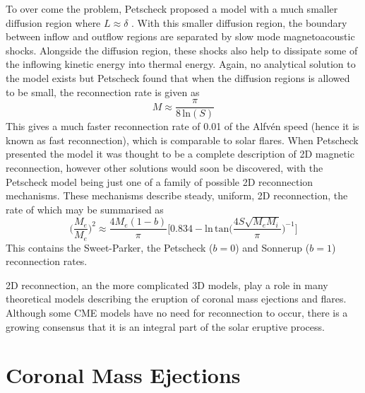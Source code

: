 To over come the problem, Petscheck proposed a model with a much smaller diffusion region where $L\approx\delta$ \citep{petschek1964} . With this smaller diffusion region, the boundary between inflow and outflow regions are separated by slow mode magnetoacoustic shocks. Alongside the diffusion region, these shocks also help to dissipate some of the inflowing kinetic energy into thermal energy. Again, no analytical solution to the model exists but Petscheck found that when the diffusion regions is allowed to be small, the reconnection rate is given as
\begin{equation}
M \approx \frac{\pi}{8\,\mathrm{ln}(S)}
\end{equation}
This gives a much faster reconnection rate of 0.01 of the Alfv\'{e}n speed (hence it is known as fast reconnection), which is comparable to solar flares. When Petscheck presented the model it was thought to be a complete description of 2D magnetic reconnection, however other solutions would soon be discovered, with the Petscheck model being just one of a family of possible 2D reconnection mechanisms. These mechanisms describe steady, uniform, 2D reconnection, the rate of which may be summarised as \citep{priest1986}
\begin{equation}
\bigg(\frac{M_e}{M_e}\bigg)^2 \approx \frac{4M_e(1-b)}{\pi}\bigg[ 0.834 -\mathrm{ln \, tan}\bigg( \frac {4S\sqrt{M_eM_i}} {\pi}  \bigg)^{-1}\bigg]
\end{equation}
This contains the Sweet-Parker, the Petscheck ($b=0$) and Sonnerup \citep{sonnerup1970}($b=1$) reconnection rates.

2D reconnection, an the more complicated 3D models, play a role in many theoretical models describing the eruption of coronal mass ejections and flares. Although some CME models have no need for reconnection to occur, there is a growing consensus that it is an integral part of the solar eruptive process.


\section{Coronal Mass Ejections}\label{sec:2}

